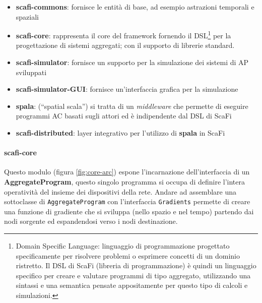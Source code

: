 \documentclass[12pt,a4paper,openright,twoside]{book}
\begin{document}
\begin{itemize}
    \item \textbf{scafi-commons}: fornisce le entità di base, ad esempio astrazioni temporali e spaziali
    \item \textbf{scafi-core}: rappresenta il core del framework fornendo il DSL\footnote{Domain Specific Language: linguaggio di programmazione progettato specificamente per risolvere problemi o esprimere concetti di un dominio ristretto. Il DSL di ScaFi (libreria di programmazione) è quindi un linguaggio specifico per creare e valutare programmi di tipo aggregato, utilizzando una sintassi e una semantica pensate appositamente per questo tipo di calcoli e simulazioni.} per la progettazione di sistemi aggregati; con il supporto di librerie standard.
    \item \textbf{scafi-simulator}: fornisce un supporto per la simulazione dei sistemi di \ac{AP} sviluppati
    \item \textbf{scafi-simulator-GUI}: fornisce un'interfaccia grafica per la simulazione
    \item \textbf{spala}: (``spatial scala'') si tratta di un \textit{middleware} che permette di eseguire programmi \ac{AC} basati sugli attori ed è indipendente dal DSL di ScaFi
    \item \textbf{scafi-distributed}: layer integrativo per l'utilizzo di \textbf{spala} in ScaFi
\end{itemize}

\paragraph{scafi-core} Questo modulo (figura \ref{fig:core-arc}) espone l'incarnazione dell'interfaccia di un \textbf{AggregateProgram}, questo singolo programma si occupa di definire l'intera operatività del insieme dei dispositivi della rete. Andare ad assemblare una sottoclasse di \verb|AggregateProgram| con l'interfaccia \verb|Gradients| permette di creare una funzione di gradiente che si sviluppa (nello spazio e nel tempo) partendo dai nodi sorgente ed espandendosi verso i nodi destinazione.
\end{document}
